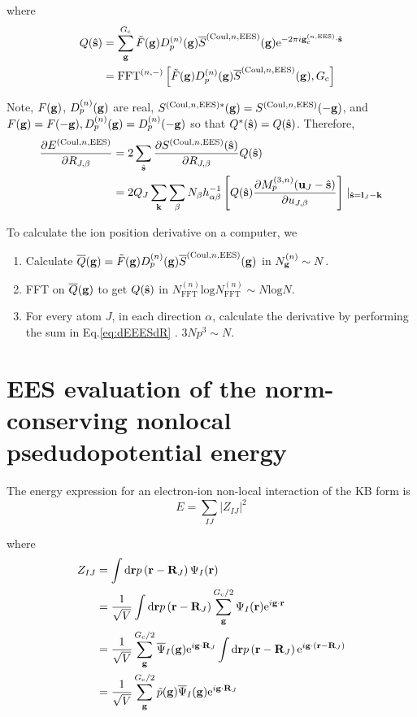 \documentclass[paper=a4, fontsize=11pt]{article} %
\numberwithin{equation}{section} %
\numberwithin{figure}{section} %
\numberwithin{table}{section} %
\newcommand{\p}{\partial}
\newcommand{\ol}{\overline}
\newcommand{\bu}{{\bf{u}}}
\newcommand{\bl}{{\bf{l}}}
\newcommand{\bk}{{\bf{k}}}
\newcommand{\bs}{{\bf{s}}}
\newcommand{\bg}{{\bf{g}}}
\newcommand{\br}{{\bf{r}}}
\newcommand{\bR}{{\bf{R}}}
\newcommand{\hs}{{\hat{\bf{s}}}}
\newcommand{\rEES}{{\mathrm{EES}}}
\newcommand{\re}{{\mathrm{e}}}
\newcommand{\rCo}{{\mathrm{Coul}}}
\newcommand{\rd}{{\mathrm{d}}}
\newcommand{\rl}{{\mathrm{log}}}
\newcommand{\ibgR}{i\bg\cdot\bR}
\newcommand{\ibgr}{i\bg\cdot\br}
\newcommand{\gcnEES}{{\bg_c^{(n,\rEES)}}}
\newcommand{\al}{{\alpha}}
\newcommand{\RJb}{{R_{J,\beta}}}
\newcommand{\NFFTn}{{N^{(n)}_{\mathrm{FFT}}}}
\newcommand{\Ngn}{{N^{(n)}_\bg}}
\newcommand{\Gc}{{G_{\mathrm{c}}}}
\newcommand{\Dng}{{D^{(n)}_p(\bg)}}
\newcommand{\Mn}{{M_p^{(3,n)}}}
\newcommand{\FFTni}{{\mathrm{FFT}^{(n,-)}}}
\begin{document}
where 
\begin{equation}
\begin{split}
Q(\hat \bs) 
&= \sum_\bg^\Gc \tilde F(\bg) \Dng\ol S^{(\rCo,n,\rEES)}(\bg) \re^{-2\pi i\gcnEES \cdot \hat\bs}\\
&= \FFTni \left[\tilde F(\bg) \Dng\ol S^{(\rCo,n,\rEES)}(\bg),\Gc\right]
\end{split}
\end{equation}

Note, $F(\bg)$, $\Dng$ are real, $S^{(\rCo,n,\rEES)*}(\bg) = S^{(\rCo,n,\rEES)}(-\bg)$, and $F(\bg) = F(-\bg), \Dng = D_p^{(n)}(-\bg)$ so that $Q^*(\hat \bs) = Q(\hat \bs)$. Therefore,
\begin{equation}\label{eq:dEEESdR}
\begin{split}
\frac{\p E^{(\rCo,n,\rEES)}}{\p \RJb} 
&= 2\sum_{\hat \bs} \frac{\p S ^{(\rCo,n,\rEES)} (\hat \bs)}{\p \RJb} Q(\hat \bs) \\
&= 2Q_J\sum_\bk\sum_\beta N_\beta h_{\al\beta}^{-1} \left[Q(\hat \bs) \frac{\p \Mn(\bu_{J}-\hat \bs)}{\p u_{J,\beta}}\right]\mid_{\hat \bs=\bl_{J}-\bk}
\end{split}
\end{equation}

To calculate the ion position derivative on a computer, we
\begin{enumerate}
\item Calculate $\ol Q(\bg) = \tilde F(\bg) \Dng\ol S^{(\rCo,n,\rEES)}(\bg)$ in $\Ngn \sim N$.
\item FFT on $\ol Q(\bg)$ to get $Q(\hs)$ in $\NFFTn \rl \NFFTn \sim N\rl N$.
\item For every atom $J$, in each direction $\alpha$, calculate the derivative by performing the sum in Eq.\eqref{eq:dEEESdR} . $3 N p^3 \sim N$.
\end{enumerate}


\newpage
\section{EES evaluation of the norm-conserving nonlocal psedudopotential energy}
The energy expression for an electron-ion non-local interaction of the KB form is
\begin{equation}
E=\sum_{IJ} \left| Z_{IJ} \right| ^2
\end{equation}

where
\begin{equation}
\begin{split}
Z_{IJ}
& = \int \rd\br  p\left( \br-\bR_J \right)\Psi_I(\br) \\
& = \frac{1}{\sqrt{V}}\int \rd\br  p\left( \br-\bR_J \right) \sum_\bg^{\Gc/2} \Psi_I(\br) \re^{\ibgr} \\
& = \frac{1}{\sqrt{V}}\sum_\bg^{\Gc/2} \ol \Psi_I(\bg) \re^{\ibgR_J}\int \rd\br  p\left( \br-\bR_J \right)\re^{ i \bg\cdot(\br-\bR_J)} \\
& = \frac{1}{\sqrt{V}}\sum_\bg^{\Gc/2} \tilde p (\bg) \ol \Psi_I(\bg) \re^{\ibgR_J}
\end{split}
\end{equation}
\end{document}
